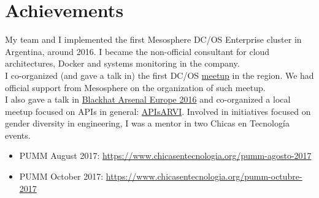 \documentclass{vitae}
\begin{document}
\section*{Achievements}
My team and I implemented the first Mesosphere DC/OS Enterprise cluster in Argentina, around 2016. I became the non-official consultant for cloud architectures, Docker and systems monitoring in the company.\\
I co-organized (and gave a talk in) the first DC/OS \href{https://www.meetup.com/es-ES/mesos-dcos-argentina/events/234352452/}{meetup} in the region. We had official support from Mesosphere on the organization of such meetup.\\
I also gave a talk in \href{https://www.blackhat.com/eu-16/presenters/Nicolas-Villanueva.html}{Blackhat Arsenal Europe 2016} and co-organized a local meetup focused on APIs in general: \href{https://www.meetup.com/es-ES/preview/APIsAR/events/243084908}{APIsARVI}.
Involved in initiatives focused on gender diversity in engineering, I was a mentor in two Chicas en Tecnología events.
\begin{itemize}[noitemsep]
    \item PUMM August 2017: \url{https://www.chicasentecnologia.org/pumm-agosto-2017}
    \item PUMM October 2017: \url{https://www.chicasentecnologia.org/pumm-octubre-2017}
\end{itemize}
\end{document}
